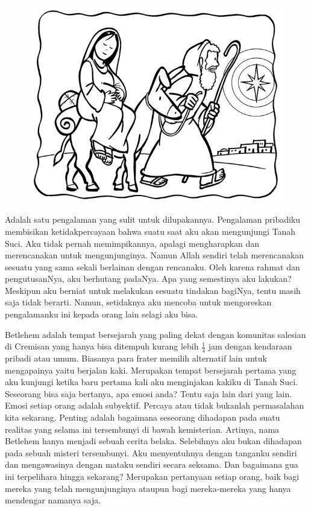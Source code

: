 \small 

\begin{figure}
\centering
\includegraphics[scale=1]{gambar/11.jpg}
\end{figure}



Adalah satu pengalaman yang sulit untuk dilupakannya. Pengalaman pribadiku membisikan ketidakpercayaan bahwa suatu saat aku akan mengunjungi Tanah Suci. Aku tidak pernah memimpikannya, apalagi mengharapkan dan merencanakan untuk mengunjunginya. Namun Allah sendiri telah merencanakan sesuatu yang sama sekali berlainan dengan rencanaku. Oleh karena rahmat dan pengutusanNya, aku berhutang padaNya. Apa yang semestinya aku lakukan? Meskipun aku berniat untuk melakukan sesuatu tindakan bagiNya, tentu masih saja tidak berarti. Namun, setidaknya aku mencoba untuk mengoreskan pengalamanku ini kepada orang lain selagi aku bisa.

Betlehem adalah tempat bersejarah yang paling dekat dengan komunitas salesian di Cremisan yang hanya bisa ditempuh kurang lebih $\frac{1}{4}$ jam dengan kendaraan pribadi atau umum. Biasanya para frater memilih alternatif lain untuk mengapainya yaitu berjalan kaki. Merupakan tempat bersejarah pertama yang aku kunjungi ketika baru pertama kali aku menginjakan kakiku di Tanah Suci. Seseorang bisa saja bertanya, apa emosi anda? Tentu saja lain dari yang lain. Emosi setiap orang adalah subyektif. Percaya atau tidak bukanlah permasalahan kita sekarang. Penting adalah bagaimana seseorang dihadapan pada suatu realitas yang selama ini tersembunyi di bawah kemisterian. Artinya, nama Betlehem hanya menjadi sebuah cerita belaka. Selebihnya aku bukan dihadapan pada sebuah misteri tersembunyi. Aku menyentuhnya dengan tanganku sendiri dan mengawasinya dengan mataku sendiri secara seksama. Dan bagaimana gua ini terpelihara hingga sekarang? Merupakan pertanyaan setiap orang, baik bagi mereka yang telah mengunjunginya ataupun bagi mereka-mereka yang hanya mendengar namanya saja. 

